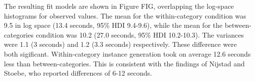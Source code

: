 The resulting fit models are shown in Figure FIG, overlapping the log-space histograms for observed values. The mean for the within-category condition was 9.5 in log space (13.4 seconds, 95\% HDI 9.4-9.6), while the mean for the between-categories condition was 10.2 (27.0 seconds, 95\% HDI 10.2-10.3). The variances were 1.1 (3 seconds) and 1.2 (3.3 seconds) respectively. These difference were both sigificant. Within-category instance generation took on average 12.6 seconds less than between-categories. This is consistent with the findings of Nijstad and Stoebe, who reported differences of 6-12 seconds.
